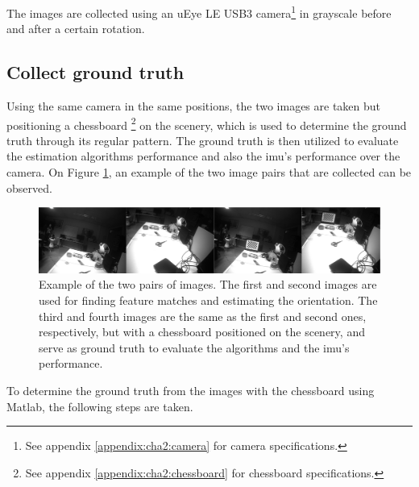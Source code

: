 The images are collected using an uEye LE USB3 camera\footnote{See appendix \ref{appendix:cha2:camera} for camera specifications.} in grayscale before and after a certain rotation.

\subsection{Collect ground truth}
\label{rnfrfref}
Using the same camera in the same positions, the two images are taken but positioning a chessboard \footnote{See appendix \ref{appendix:cha2:chessboard} for chessboard specifications.} on the scenery, which is used to determine the ground truth through its regular pattern. The ground truth is then utilized to evaluate the estimation algorithms performance and also the \acrshort{imu}'s performance over the camera. On Figure \ref{cha3:methodology:imagesex}, an example of the two image pairs that are collected can be observed.
	
\begin{figure}[ht]
	\centering
	\includegraphics[width=\textwidth]{images/imagesex.png}
	\caption[Example of the two pairs of images]{Example of the two pairs of images. The first and second images are used for finding feature matches and estimating the orientation. The third and fourth images are the same as the first and second ones, respectively, but with a chessboard positioned on the scenery, and serve as ground truth to evaluate the algorithms and the \acrshort{imu}'s performance.}
	\label{cha3:methodology:imagesex}
\end{figure}

To determine the ground truth from the images with the chessboard using Matlab, the following steps are taken.

